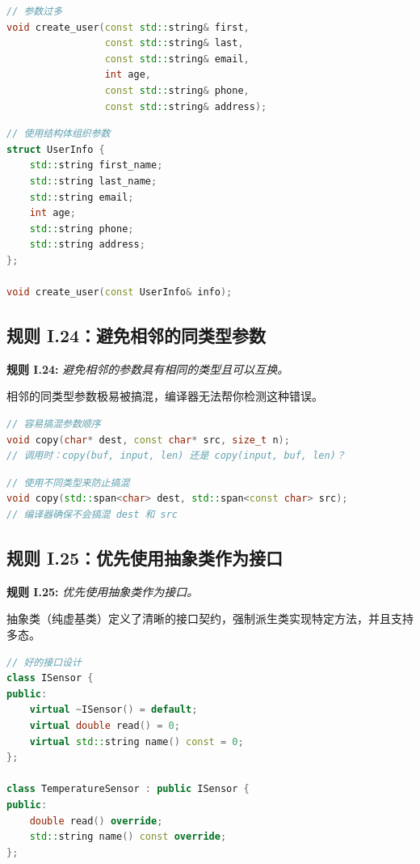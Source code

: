 \begin{lstlisting}[language=C++]
// 参数过多
void create_user(const std::string& first,
                 const std::string& last,
                 const std::string& email,
                 int age,
                 const std::string& phone,
                 const std::string& address);
\end{lstlisting}

\begin{lstlisting}[language=C++]
// 使用结构体组织参数
struct UserInfo {
    std::string first_name;
    std::string last_name;
    std::string email;
    int age;
    std::string phone;
    std::string address;
};

void create_user(const UserInfo& info);
\end{lstlisting}

\subsection{规则 I.24：避免相邻的同类型参数}

\textbf{规则 I.24:} \textit{避免相邻的参数具有相同的类型且可以互换。}

相邻的同类型参数极易被搞混，编译器无法帮你检测这种错误。

\begin{lstlisting}[language=C++]
// 容易搞混参数顺序
void copy(char* dest, const char* src, size_t n);
// 调用时：copy(buf, input, len) 还是 copy(input, buf, len)？
\end{lstlisting}

\begin{lstlisting}[language=C++]
// 使用不同类型来防止搞混
void copy(std::span<char> dest, std::span<const char> src);
// 编译器确保不会搞混 dest 和 src
\end{lstlisting}

\subsection{规则 I.25：优先使用抽象类作为接口}

\textbf{规则 I.25:} \textit{优先使用抽象类作为接口。}

抽象类（纯虚基类）定义了清晰的接口契约，强制派生类实现特定方法，并且支持多态。

\begin{lstlisting}[language=C++]
// 好的接口设计
class ISensor {
public:
    virtual ~ISensor() = default;
    virtual double read() = 0;
    virtual std::string name() const = 0;
};

class TemperatureSensor : public ISensor {
public:
    double read() override;
    std::string name() const override;
};
\end{lstlisting}

